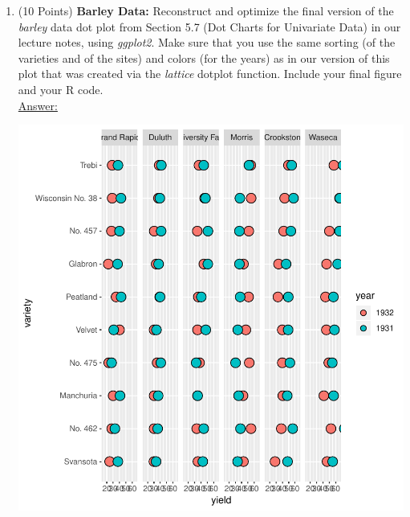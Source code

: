 \documentclass[12pt,letterpaper,final]{article}
\begin{document}
\begin{enumerate}
\begin{enumerate}
\end{enumerate}


\newpage


\item (10 Points) {\bf Barley Data:}
Reconstruct and optimize the final version of the {\it barley} data dot plot
from Section 5.7 (Dot Charts for Univariate Data) in our lecture notes, using {\it ggplot2}. 
Make sure that you use the same sorting (of the varieties and of the sites) and colors (for the years)
as in our version of this plot
that was created via the {\it lattice} dotplot function.
Include your final figure and your R code. \\


\underline{Answer:}
{\scriptsize
\begin{Schunk}
\end{Schunk}
\includegraphics{hw02_bartschi-017}
}


\end{enumerate}


\newpage


~\\
\end{document}
